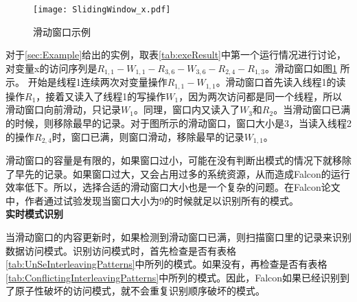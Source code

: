 \begin{figure}[!ht]
  \centering
  \texttt{[image: SlidingWindow\_x.pdf]}
  \caption{滑动窗口示例}\label{pic:slidingWindow}
\end{figure}
对于\ref{sec:Example}给出的实例，取表\ref{tab:exeResult}中第一个运行情况进行讨论，对变量x的访问序列是$R_{1,1}-W_{1,1}-R_{3,6}-W_{3,6}-R_{2,4}-R_{1,3}$。滑动窗口如图\ref{pic:slidingWindow} 所示。
开始是线程1连续两次对变量操作$R_{1,1}-W_{1,1}$。滑动窗口首先读入线程1的读操作$R_{1}$，接着又读入了线程1的写操作$W_{1}$，因为两次访问都是同一个线程，所以滑动窗口向前滑动，只记录$W_1$。同理，窗口内又读入了$W_3$和$R_2$。当滑动窗口已满的时候，则移除最早的记录。对于图所示的滑动窗口，窗口大小是3，当读入线程2的操作$R_{2,4}$时，窗口已满，则窗口滑动，移除最早的记录$W_{1,1}$。\par
滑动窗口的容量是有限的，如果窗口过小，可能在没有判断出模式的情况下就移除了早先的记录。如果窗口过大，又会占用过多的系统资源，从而造成Falcon的运行效率低下。所以，选择合适的滑动窗口大小也是一个复杂的问题。在Falcon论文中，作者通过试验发现当窗口大小为9的时候就足以识别所有的模式\cite{park2010falcon}。\\
\textbf{实时模式识别}\par
当滑动窗口的内容更新时，如果检测到滑动窗口已满，则扫描窗口里的记录来识别数据访问模式。识别访问模式时，首先检查是否有表格\ref{tab:UnSeInterleavingPatterns}中所列的模式。如果没有，再检查是否有表格\ref{tab:ConflictingInterleavingPatterns}中所列的模式。因此，Falcon如果已经识别到了原子性破坏的访问模式，就不会重复识别顺序破坏的模式。\par
